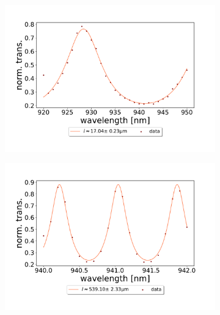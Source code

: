 \begin{figure}[h!]
    \centering
    \begin{subfigure}[b]{0.49\textwidth}
        \centering
        \includegraphics[width=\textwidth]{figures/results/double fano fits/30um_M3:M5_FSR_scan.pdf}
        \caption{}
        \label{fig:short_double_fano_FSR}
    \end{subfigure}
    \begin{subfigure}[b]{0.49\textwidth}
        \centering
        \includegraphics[width=\textwidth]{figures/results/double fano fits/550um_M3:M5_FSR_scan.pdf}
        \caption{}
        \label{fig:long_double_fano_FSR}
    \end{subfigure}
\end{figure}

